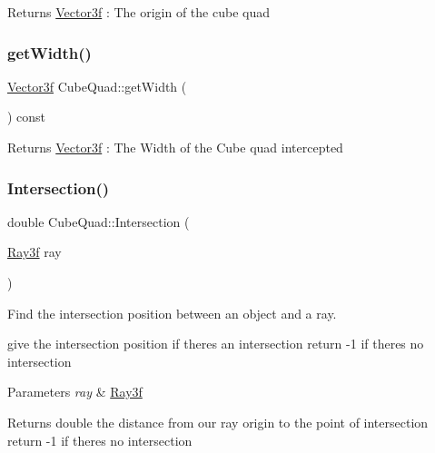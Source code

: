 \begin{DoxyReturn}{Returns}
\mbox{\hyperlink{class_vector3f}{Vector3f}} \+: The origin of the cube quad 
\end{DoxyReturn}
\mbox{\label{class_cube_quad_a7229846a07dc9f641d16a488da740a49}} 
\subsubsection{\texorpdfstring{get\+Width()}{getWidth()}}
{\footnotesize\ttfamily \mbox{\hyperlink{class_vector3f}{Vector3f}} Cube\+Quad\+::get\+Width (\begin{DoxyParamCaption}{ }\end{DoxyParamCaption}) const\hspace{0.3cm}{\ttfamily [inline]}}

\begin{DoxyReturn}{Returns}
\mbox{\hyperlink{class_vector3f}{Vector3f}} \+: The Width of the Cube quad intercepted 
\end{DoxyReturn}
\mbox{\label{class_cube_quad_a3b51f8216f2ba340174edb542af33c0a}} 
\subsubsection{\texorpdfstring{Intersection()}{Intersection()}}
{\footnotesize\ttfamily double Cube\+Quad\+::\+Intersection (\begin{DoxyParamCaption}\item[{\mbox{\hyperlink{class_ray3f}{Ray3f}}}]{ray }\end{DoxyParamCaption})\hspace{0.3cm}{\ttfamily [virtual]}}



Find the intersection position between an object and a ray. 

give the intersection position if there\textquotesingle{}s an intersection return -\/1 if there\textquotesingle{}s no intersection 
\begin{DoxyParams}{Parameters}
{\em ray} & \mbox{\hyperlink{class_ray3f}{Ray3f}} \\
\hline
\end{DoxyParams}
\begin{DoxyReturn}{Returns}
double the distance from our ray origin to the point of intersection return -\/1 if there\textquotesingle{}s no intersection 
\end{DoxyReturn}


